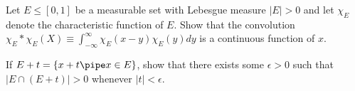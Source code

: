 \begin{alist}
\item Let $E\leq [0,1]$ be a measurable set with Lebesgue measure $|E|>0$
and let $\chi_E$ denote the characteristic function of $E$.  Show that
the convolution $\chi_E\ast\chi_E(X)\equiv \int_{-\infty}^{\infty}
\chi_E(x-y)\chi_E(y) dy$ is a continuous function of $x$.
\item If $E+t=\{x+t \pipe x\in E\}$, show that there exists some
$\epsilon>0$ such that $|E\cap (E+t)|>0$ whenever $|t|<\epsilon$.
\end{alist}
